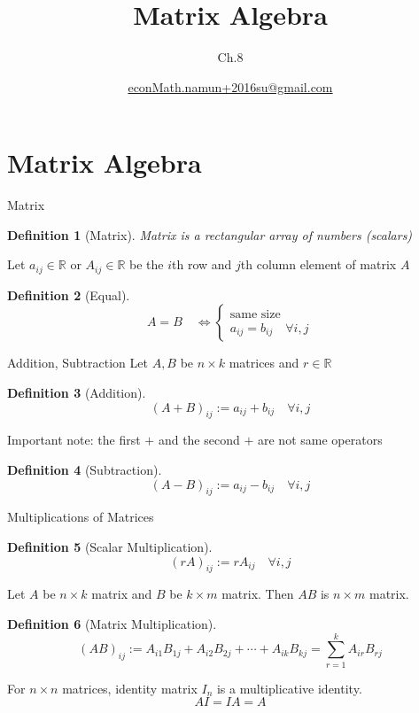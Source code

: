\documentclass[a4paper,11pt]{article}
\author[조남운]{\url{econMath.namun+2016su@gmail.com}}
\title{Matrix Algebra}
\subtitle{Ch.8}
\newtheorem{defn}{Definition}
\begin{document}
	
\maketitle


\section{Matrix Algebra} %
\label{sec:matrix_algebra}
\begin{frame}[t]{Matrix}
	\begin{defn}
		[Matrix]
		Matrix is a rectangular array of numbers (scalars)
	\end{defn}
	
	Let $a_{ij}\in \mathbb{R}$ or $A_{ij}\in\mathbb{R}$ be the $i$th row and $j$th column element of matrix $A$
	
	\begin{defn}
		[Equal]
		\[
			A=B\quad \iff \begin{cases}
				\text{same size}\\
				a_{ij}=b_{ij} \quad \forall i,j
			\end{cases}
		\]
	\end{defn}
	
\end{frame}

\begin{frame}[t]{Addition, Subtraction}
	Let $A,B$ be $n\times k$ matrices and $r\in \mathbb{R}$
	\begin{defn}
		[Addition]
		\[
			(A+B)_{ij} := a_{ij}+b_{ij}\quad\forall i,j
		\]
	\end{defn}
	Important note: the first $+$ and the second $+$ are not same operators
	
	\begin{defn}
		[Subtraction]
		\[
			(A-B)_{ij} := a_{ij}-b_{ij}\quad\forall i,j
		\]
	\end{defn}
\end{frame}

\begin{frame}[t]{Multiplications of Matrices}
	\begin{defn}
		[Scalar Multiplication]
		\[
			(rA)_{ij} := r A_{ij}\quad\forall i,j
		\]
	\end{defn}
	Let $A$ be $n\times k$ matrix and $B$ be $k\times m$ matrix. Then $AB$ is $n\times m$ matrix.
	\begin{defn}
		[Matrix Multiplication]
		\[
			(AB)_{ij}:=A_{i1}B_{1j}+A_{i2}B_{2j}+\cdots+A_{ik}B_{kj}= \sum_{r=1}^k A_{ir}B_{rj}
		\]
	\end{defn}
	For $n\times n$ matrices, identity matrix $I_n$ is a multiplicative identity. 
	\[
		AI = IA = A
	\]
\end{frame}
\end{document}
